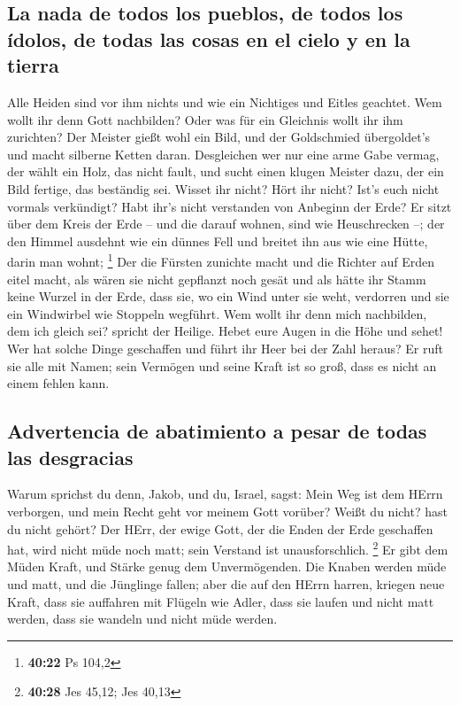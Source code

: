 \hypertarget{la-nada-de-todos-los-pueblos-de-todos-los-uxeddolos-de-todas-las-cosas-en-el-cielo-y-en-la-tierra}{%
\subsection{La nada de todos los pueblos, de todos los ídolos, de todas
las cosas en el cielo y en la
tierra}\label{la-nada-de-todos-los-pueblos-de-todos-los-uxeddolos-de-todas-las-cosas-en-el-cielo-y-en-la-tierra}}

 Alle Heiden sind vor ihm nichts und wie ein Nichtiges
und Eitles geachtet.  Wem wollt ihr denn Gott nachbilden?
Oder was für ein Gleichnis wollt ihr ihm zurichten?  Der
Meister gießt wohl ein Bild, und der Goldschmied übergoldet's und macht
silberne Ketten daran.  Desgleichen wer nur eine arme
Gabe vermag, der wählt ein Holz, das nicht fault, und sucht einen klugen
Meister dazu, der ein Bild fertige, das beständig sei. 
Wisset ihr nicht? Hört ihr nicht? Ist's euch nicht vormals verkündigt?
Habt ihr's nicht verstanden von Anbeginn der Erde?  Er
sitzt über dem Kreis der Erde -- und die darauf wohnen, sind wie
Heuschrecken --; der den Himmel ausdehnt wie ein dünnes Fell und breitet
ihn aus wie eine Hütte, darin man wohnt; \footnote{\textbf{40:22} Ps
  104,2}  Der die Fürsten zunichte macht und die Richter
auf Erden eitel macht,  als wären sie nicht gepflanzt
noch gesät und als hätte ihr Stamm keine Wurzel in der Erde, dass sie,
wo ein Wind unter sie weht, verdorren und sie ein Windwirbel wie
Stoppeln wegführt.  Wem wollt ihr denn mich nachbilden,
dem ich gleich sei? spricht der Heilige.  Hebet eure
Augen in die Höhe und sehet! Wer hat solche Dinge geschaffen und führt
ihr Heer bei der Zahl heraus? Er ruft sie alle mit Namen; sein Vermögen
und seine Kraft ist so groß, dass es nicht an einem fehlen kann.

\hypertarget{advertencia-de-abatimiento-a-pesar-de-todas-las-desgracias}{%
\subsection{Advertencia de abatimiento a pesar de todas las
desgracias}\label{advertencia-de-abatimiento-a-pesar-de-todas-las-desgracias}}

 Warum sprichst du denn, Jakob, und du, Israel, sagst:
Mein Weg ist dem HErrn verborgen, und mein Recht geht vor meinem Gott
vorüber?  Weißt du nicht? hast du nicht gehört? Der HErr,
der ewige Gott, der die Enden der Erde geschaffen hat, wird nicht müde
noch matt; sein Verstand ist unausforschlich. \footnote{\textbf{40:28}
  Jes 45,12; Jes 40,13}  Er gibt dem Müden Kraft, und
Stärke genug dem Unvermögenden.  Die Knaben werden müde
und matt, und die Jünglinge fallen;  aber die auf den
HErrn harren, kriegen neue Kraft, dass sie auffahren mit Flügeln wie
Adler, dass sie laufen und nicht matt werden, dass sie wandeln und nicht
müde werden.

